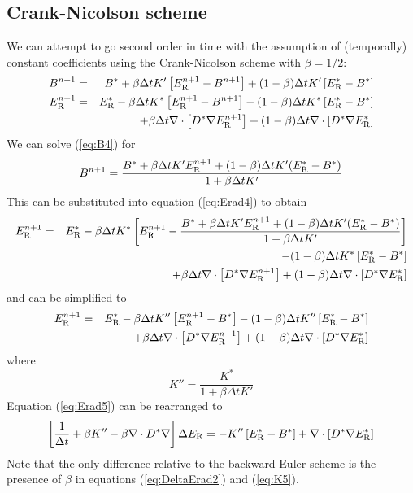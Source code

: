 \documentclass[12pt]{article}
\newcommand{\Erad}{E_{\rm R}}
\begin{document}
\newpage

\subsection{Crank-Nicolson scheme}

We can attempt to go second order in time with the assumption of
(temporally) constant coefficients using the Crank-Nicolson scheme
with $\beta=1/2$:
\begin{eqnarray}
B^{n+1} &=& B^* 
   + \beta \Delta t K'\left[\Erad^{n+1} - B^{n+1}\right]  
   + (1-\beta)\Delta t K'\left[\Erad^* - B^*\right]  
   \label{eq:B4}\\
\Erad^{n+1} &=& \Erad^* 
   - \beta \Delta t K^*\left[\Erad^{n+1} - B^{n+1} \right]
   - (1-\beta) \Delta t K^*\left[\Erad^* - B^*\right] \nonumber\\
   && + \beta\Delta t \nabla\cdot\left[ D^* \nabla \Erad^{n+1} \right]
      + (1-\beta)\Delta t \nabla\cdot\left[ D^* \nabla \Erad^* \right]
   \label{eq:Erad4}
\end{eqnarray}
We can solve (\ref{eq:B4}) for 
\begin{equation}
  B^{n+1} = \frac{B^* + \beta \Delta t K' \Erad^{n+1}
                  + (1-\beta)  \Delta t K' (\Erad^* - B^*)}
                 {1 + \beta\Delta t K'}
   \label{eq:B5}
\end{equation}
This can be substituted into equation (\ref{eq:Erad4}) to obtain
\begin{eqnarray}
\Erad^{n+1} &=& \Erad^* - \beta \Delta t K^*\left[\Erad^{n+1} 
              - \frac{B^* + \beta \Delta t K' \Erad^{n+1}
                      + (1-\beta)  \Delta t K' (\Erad^* - B^*)}
                     {1 + \beta\Delta t K'}\right] \nonumber\\
  && - (1-\beta) \Delta t K^*\left[\Erad^* - B^*\right] \nonumber\\
  && +     \beta \Delta t \nabla\cdot\left[ D^* \nabla \Erad^{n+1} \right]
      + (1-\beta)\Delta t \nabla\cdot\left[ D^* \nabla \Erad^* \right]
\end{eqnarray}
and can be simplified to
\begin{eqnarray}
\Erad^{n+1} &=& \Erad^* - \beta \Delta t K''\left[\Erad^{n+1} 
              - B^*  \right] 
    - (1-\beta) \Delta t K'' \left[\Erad^* - B^*\right] \nonumber\\
  && +     \beta \Delta t \nabla\cdot\left[ D^* \nabla \Erad^{n+1} \right]
      + (1-\beta)\Delta t \nabla\cdot\left[ D^* \nabla \Erad^* \right]
  \label{eq:Erad5}
\end{eqnarray}
where
\begin{equation}
K'' = \frac{K^*}{1 + \beta \Delta t K'}  \label{eq:K5}
\end{equation}
Equation (\ref{eq:Erad5}) can be rearranged to
\begin{equation}
\left[\frac{1}{\Delta t} + \beta K'' - \beta \nabla\cdot D^* \nabla\right] 
   \Delta \Erad 
   = - K''\left[\Erad^* - B^*\right]
                + \nabla\cdot\left[ D^* \nabla \Erad^* \right]
\label{eq:DeltaErad2}
\end{equation}
Note that the only difference relative to the backward Euler scheme is
the presence of $\beta$ in equations (\ref{eq:DeltaErad2}) and (\ref{eq:K5}). 
\end{document}
